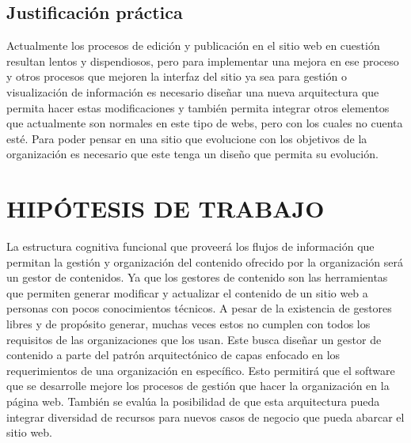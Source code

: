 \subsection{Justificación práctica}

Actualmente los procesos de edición y publicación en el sitio web en cuestión resultan lentos y dispendiosos, pero para implementar una mejora en ese proceso y otros procesos que mejoren la interfaz del sitio ya sea para gestión o visualización de información es necesario diseñar una nueva arquitectura que permita hacer estas modificaciones y también permita integrar otros elementos que actualmente son normales en este tipo de webs, pero con los cuales no cuenta esté. Para poder pensar en una sitio que evolucione con los objetivos de la organización es necesario que este tenga un diseño que permita su evolución.

\newpage
\section{HIPÓTESIS DE TRABAJO}

La estructura cognitiva funcional que proveerá los flujos de información que permitan la gestión y organización del contenido ofrecido por la organización será un gestor de contenidos. Ya que los gestores de contenido son las herramientas que permiten generar modificar y actualizar el contenido de un sitio web a personas con pocos conocimientos técnicos. A pesar de la existencia de gestores libres y de propósito generar, muchas veces estos no cumplen con todos los requisitos de las organizaciones que los usan. Este busca diseñar un gestor de contenido a parte del patrón arquitectónico de capas enfocado en los requerimientos de una organización en específico. Esto permitirá que el software que se desarrolle mejore los procesos de gestión que hacer la organización en la página web. También se evalúa la posibilidad de que esta arquitectura pueda integrar diversidad de recursos para nuevos casos de negocio que pueda abarcar el sitio web.

